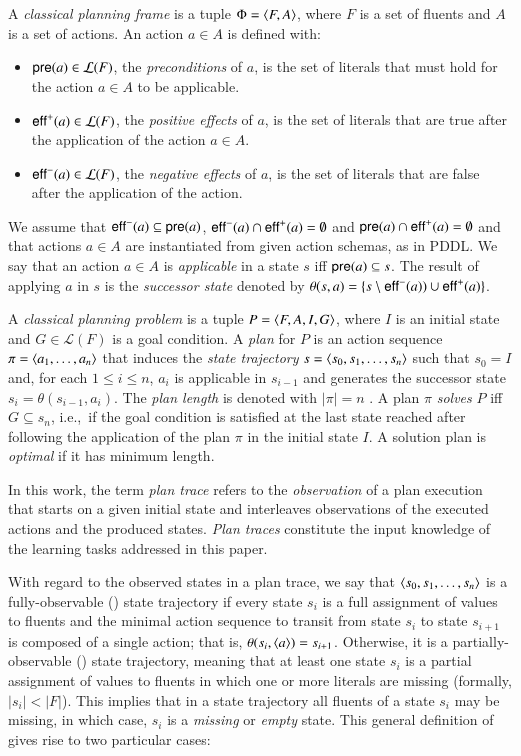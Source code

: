 A {\em classical planning frame} is a tuple $\Phi={\langle F,A \rangle}$, where $F$ is a set of fluents and $A$ is a set of actions. An action $a\in A$ is defined with:
\begin{itemize}
\item $\mathsf{pre}(a)\in\mathcal{L}(F)$, the {\em preconditions} of $a$, is the set of literals that must hold for the action $a\in A$ to be applicable.
\item $\mathsf{eff}^+(a)\in\mathcal{L}(F)$, the {\em positive effects} of $a$, is the set of literals that are true after the application of the action $a\in A$.
\item $\mathsf{eff}^-(a)\in\mathcal{L}(F)$, the {\em negative effects} of $a$, is the set of literals that are false after the application of the action.
\end{itemize}
We assume that $\mathsf{eff}^-(a)\subseteq \mathsf{pre}(a)$, $\mathsf{eff}^-(a)\cap \mathsf{eff}^+(a)=\emptyset$ and $\mathsf{pre}(a)\cap \mathsf{eff}^+(a)=\emptyset$ and that actions $a\in A$ are instantiated from given action schemas, as in PDDL. We say that an action $a\in A$ is {\em applicable} in a state $s$ iff $\mathsf{pre}(a)\subseteq s$. The result of applying $a$ in $s$ is the {\em successor state} denoted by $\theta(s,a)=\{s\setminus\mathsf{eff}^-(a))\cup\mathsf{eff}^+(a)\}$.

A {\em classical planning problem} is a tuple $P={\langle F,A,I,G \rangle}$, where $I$ is an initial state and $G\in\mathcal{L}(F)$ is a goal condition. A {\em plan} for $P$ is an action sequence $\pi={\langle a_1, \ldots, a_n \rangle}$ that induces the {\em state trajectory} $s={\langle s_0, s_1, \ldots, s_n \rangle}$ such that $s_0=I$ and, for each {\small $1\leq i\leq n$}, $a_i$ is applicable in $s_{i-1}$ and generates the successor state $s_i=\theta(s_{i-1},a_i)$. The {\em plan length} is denoted with $|\pi|=n$ . A plan $\pi$ {\em solves} $P$ iff $G\subseteq s_n$, i.e.,~if the goal condition is satisfied at the last state reached after following the application of the plan $\pi$ in the initial state $I$. A solution plan is {\em optimal} if it has minimum length.

In this work, the term \emph{plan trace} refers to the \emph{observation} of a plan execution that starts on a given initial state and interleaves observations of the executed actions and the produced states. \emph{Plan traces} constitute the input knowledge of the learning tasks addressed in this paper.

With regard to the observed states in a plan trace, we say that ${\langle s_0, s_1, \ldots, s_n \rangle}$ is a fully-observable (\FO) state trajectory if every state $s_i$ is a full assignment of values to fluents and the minimal action sequence to transit from state $s_i$ to state $s_{i+1}$ is composed of a single action; that is, $\theta(s_i,{\langle a \rangle})=s_{i+1}$. Otherwise, it is a partially-observable (\PO) state trajectory, meaning that at least one state $s_i$ is a partial assignment of values to fluents in which one or more literals are missing (formally, $|s_i|<|F|$). This implies that in a \PO state trajectory all fluents of a state $s_i$ may be missing, in which case, $s_i$ is a \emph{missing} or \emph{empty} state. This general definition of \PO gives rise to two particular cases:

